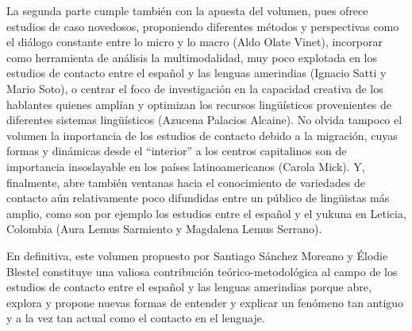 \documentclass[output=paper]{langscibook}
\begin{document}
\largerpage
La segunda parte cumple también con la apuesta del volumen, pues ofrece estudios de caso novedosos, proponiendo diferentes métodos y perspectivas como el diálogo constante entre lo micro y lo macro (Aldo Olate Vinet), incorporar como herramienta de análisis la multimodalidad, muy poco explotada en los estudios de contacto entre el español y las lenguas amerindias (Ignacio Satti y Mario Soto), o centrar el foco de investigación en la capacidad creativa de los hablantes quienes amplían y optimizan los recursos lingüísticos provenientes de diferentes sistemas lingüísticos (Azucena Palacios Alcaine). No olvida tampoco el volumen la importancia de los estudios de contacto debido a la migración, cuyas formas y dinámicas desde el “interior” a los centros capitalinos son de importancia insoslayable en los países latinoamericanos (Carola Mick). Y, finalmente, abre también ventanas hacia el conocimiento de variedades de contacto aún relativamente poco difundidas entre un público de lingüistas más amplio, como son por ejemplo los estudios entre el español y el yukuna en Leticia, Colombia (Aura Lemus Sarmiento y Magdalena Lemus Serrano). 

En definitiva, este volumen propuesto por Santiago Sánchez Moreano y Élodie Blestel constituye una valiosa contribución teórico-metodológica al campo de los estudios de contacto entre el español y las lenguas amerindias porque abre, explora y propone nuevas formas de entender y explicar un fenómeno tan antiguo y a la vez tan actual como el contacto en el lenguaje. 
\end{document}
